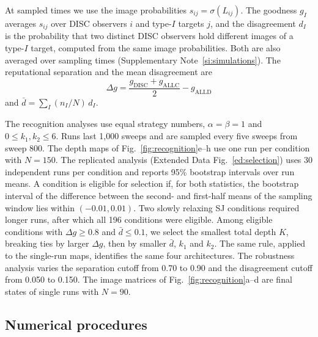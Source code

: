 \documentclass[10pt]{wlscirep}
\newcommand{\ALLC}{\mathrm{ALLC}}
\newcommand{\ALLD}{\mathrm{ALLD}}
\newcommand{\DISC}{\mathrm{DISC}}
\theoremstyle{plain}
\theoremstyle{remark}
\begin{document}
At sampled times we use the image probabilities $s_{ij}=\sigma(L_{ij})$. The goodness $g_I$ averages $s_{ij}$ over DISC observers $i$ and type-$I$ targets $j$, and the disagreement $d_I$ is the probability that two distinct DISC observers hold different images of a type-$I$ target, computed from the same image probabilities. Both are also averaged over sampling times (Supplementary Note~\ref{si:simulations}). The reputational separation and the mean disagreement are
\begin{equation}
\Delta g=\frac{g_{\DISC}+g_{\ALLC}}{2}-g_{\ALLD}
\label{eq:separation}
\end{equation}
and $\bar d=\sum_I(n_I/N)\,d_I$.

The recognition analyses use equal strategy numbers, $\alpha=\beta=1$ and $0\leq k_1,k_2\leq6$. Runs last 1,000 sweeps and are sampled every five sweeps from sweep 800. The depth maps of Fig.~\ref{fig:recognition}e--h use one run per condition with $N=150$. The replicated analysis (Extended Data Fig.~\ref{ed:selection}) uses 30 independent runs per condition and reports 95\% bootstrap intervals over run means. A condition is eligible for selection if, for both statistics, the bootstrap interval of the difference between the second- and first-half means of the sampling window lies within $(-0.01,0.01)$. Two slowly relaxing SJ conditions required longer runs, after which all 196 conditions were eligible. Among eligible conditions with $\Delta g\geq0.8$ and $\bar d\leq0.1$, we select the smallest total depth $K$, breaking ties by larger $\Delta g$, then by smaller $\bar d$, $k_1$ and $k_2$. The same rule, applied to the single-run maps, identifies the same four architectures. The robustness analysis varies the separation cutoff from 0.70 to 0.90 and the disagreement cutoff from 0.050 to 0.150. The image matrices of Fig.~\ref{fig:recognition}a--d are final states of single runs with $N=90$.

\subsection*{Numerical procedures}
\end{document}
